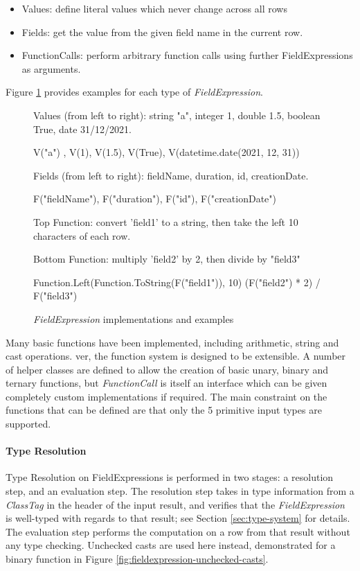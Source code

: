 \begin{itemize}
	\item Values: define literal values which never change across all rows
	\item Fields: get the value from the given field name in the current row.
	\item FunctionCalls: perform arbitrary function calls using further FieldExpressions as arguments.
\end{itemize}

Figure \ref{fig:field-expressions-examples} provides examples for each type of \textit{FieldExpression}.

\begin{figure}[htp]
	Values (from left to right): string "a", integer 1, double 1.5, boolean True, date 31/12/2021.
	\begin{python}
V("a") , V(1), V(1.5), V(True), V(datetime.date(2021, 12, 31))
	\end{python}

	Fields (from left to right): fieldName, duration, id, creationDate.
	\begin{python}
F("fieldName"), F("duration"), F("id"), F("creationDate")
	\end{python}

	Top Function: convert 'field1' to a string, then take the left 10 characters of each row.
	
	Bottom Function: multiply 'field2' by 2, then divide by "field3"
	\begin{python}
Function.Left(Function.ToString(F("field1")), 10)
(F("field2") * 2) / F("field3")
	\end{python}
	\caption{\textit{FieldExpression} implementations and examples}
	\label{fig:field-expressions-examples}
\end{figure}

Many basic functions have been implemented, including arithmetic, string and cast operations. ver, the function system is designed to be extensible. A number of helper classes are defined to allow the creation of basic unary, binary and ternary functions, but \textit{FunctionCall} is itself an interface which can be given completely custom implementations if required. The main constraint on the functions that can be defined are that only the 5 primitive input types are supported.

\paragraph{Type Resolution} 
Type Resolution on FieldExpressions is performed in two stages: a resolution step, and an evaluation step. The resolution step takes in type information from a \textit{ClassTag} in the header of the input result, and verifies that the \textit{FieldExpression} is well-typed with regards to that result; see Section \ref{sec:type-system} for details. The evaluation step performs the computation on a row from that result without any type checking. Unchecked casts are used here instead, demonstrated for a binary function in Figure \ref{fig:fieldexpression-unchecked-casts}. 

